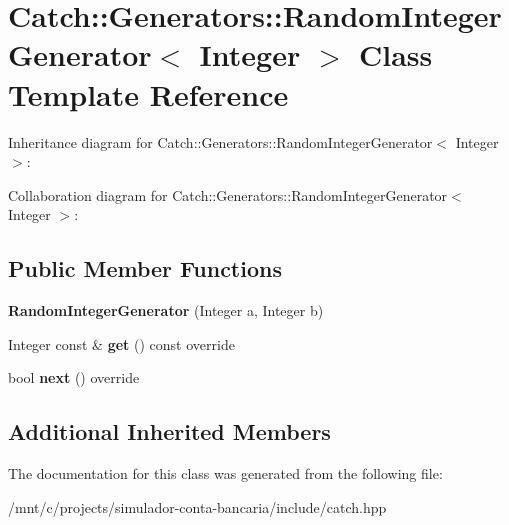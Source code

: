 \hypertarget{classCatch_1_1Generators_1_1RandomIntegerGenerator}{}\section{Catch\+:\+:Generators\+:\+:Random\+Integer\+Generator$<$ Integer $>$ Class Template Reference}
\label{classCatch_1_1Generators_1_1RandomIntegerGenerator}


Inheritance diagram for Catch\+:\+:Generators\+:\+:Random\+Integer\+Generator$<$ Integer $>$\+:


Collaboration diagram for Catch\+:\+:Generators\+:\+:Random\+Integer\+Generator$<$ Integer $>$\+:
\subsection*{Public Member Functions}
\begin{DoxyCompactItemize}
\item 
\mbox{\label{classCatch_1_1Generators_1_1RandomIntegerGenerator_a886d16c899ad70781b83a0e8f9d2cf96}} 
{\bfseries Random\+Integer\+Generator} (Integer a, Integer b)
\item 
\mbox{\label{classCatch_1_1Generators_1_1RandomIntegerGenerator_aafbdf9028762f5e8f8ca9c317d686fca}} 
Integer const  \& {\bfseries get} () const override
\item 
\mbox{\label{classCatch_1_1Generators_1_1RandomIntegerGenerator_aaa3db70fbdfa3e8dcb61fb5592eba81f}} 
bool {\bfseries next} () override
\end{DoxyCompactItemize}
\subsection*{Additional Inherited Members}


The documentation for this class was generated from the following file\+:\begin{DoxyCompactItemize}
\item 
/mnt/c/projects/simulador-\/conta-\/bancaria/include/catch.\+hpp\end{DoxyCompactItemize}
